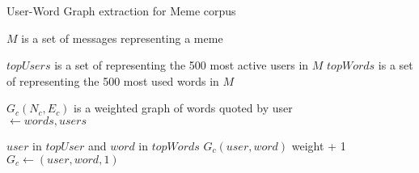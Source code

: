 \begin{algorithm}[H]
    \caption{User-Word Graph extraction for Meme corpus}
    \label{algo:meme-graph}
    \begin{algorithmic}
        \Require $M$ is a set of messages representing a meme

        \State $topUsers$ is a set of representing the 500 most active users in $M$
        \State $topWords$ is a set of representing the 500 most used words in $M$

        \State $G_c(N_c,E_c)$ is a weighted graph of words quoted by user
        \\
                \State {}  $ \gets words, users$

                    \If $user$ in $topUser$ and $word$ in $topWords$ 
                            \State $G_c(user,word)$ weight + 1
                        \Else
                            \State $G_c \gets (user,word,1)$
                        \EndIf
                    \EndIf
                \EndFor

            \EndFor
        \EndFunction

    \end{algorithmic}
\end{algorithm}